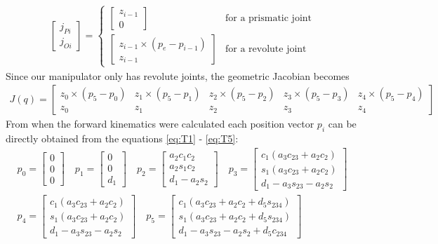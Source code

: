 \begin{align*}
    \begin{bmatrix}
        j_{Pi}\\j_{Oi}
    \end{bmatrix}
    =
    \begin{cases}
        \begin{bmatrix} z_{i-1}\\ 0 \end{bmatrix} & \text{for a prismatic joint}\\
        \begin{bmatrix} z_{i-1} \times (p_e-p_{i-1}) \\ z_{i-1} \end{bmatrix} & \text{for a revolute joint}
    \end{cases}
\end{align*}
Since our manipulator only has revolute joints, the geometric Jacobian becomes
\begin{align*}
    J(q) = 
    \begin{bmatrix}
        z_0 \times (p_5-p_0) & 
        z_1 \times (p_5-p_1) & 
        z_2 \times (p_5-p_2) & 
        z_3 \times (p_5-p_3) & 
        z_4 \times (p_5-p_4) \\
        z_0 &
        z_1 &
        z_2 &
        z_3 &
        z_4
    \end{bmatrix}
\end{align*}
From when the forward kinematics were calculated each position vector $p_i$ can be directly obtained from the equations \eqref{eq:T1} - \eqref{eq:T5}:
\begin{align*}
    p_0 = \begin{bmatrix} 0 \\ 0 \\ 0 \end{bmatrix}    \quad
    p_1 = \begin{bmatrix} 0 \\ 0 \\ d_1\end{bmatrix}    \quad
    p_2 = \begin{bmatrix} a_2c_1c_2\\ a_2s_1c_2\\ d_1 - a_2s_2\end{bmatrix}   \quad 
    p_3 = \begin{bmatrix} c_1(a_3c_{23} + a_2c_2) \\ s_1(a_3c_{23} + a_2c_2) \\ d_1 - a_3s_{23}-a_2s_2 \end{bmatrix}  \\  
    p_4 = \begin{bmatrix} c_1(a_3c_{23} + a_2c_2) \\ s_1(a_3c_{23} + a_2c_2) \\ d_1 - a_3s_{23}-a_2s_2\end{bmatrix}  \quad  
    p_5 = \begin{bmatrix} c_1(a_3c_{23} + a_2c_2 + d_5s_{234}) \\ s_1(a_3c_{23} + a_2c_2 + d_5s_{234}) \\ d_1 - a_3s_{23} - a_2s_2 + d_5c_{234} \end{bmatrix}    
\end{align*}
